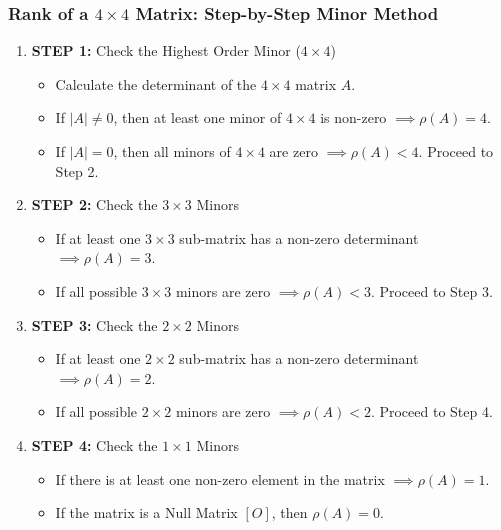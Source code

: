 \subsubsection{Rank of a $4 \times 4$ Matrix: Step-by-Step Minor Method}

\begin{enumerate}
    \item[] \textbf{STEP 1:} {Check the Highest Order Minor ($4 \times 4$)}
    \begin{itemize}
        \item Calculate the determinant of the $4 \times 4$ matrix $A$.
        \item If $|A| \neq 0$, then at least one minor of $4 \times 4$ is non-zero $\implies \rho(A) = 4$.
        \item If $|A| = 0$, then all minors of $4 \times 4$ are zero $\implies \rho(A) < 4$. Proceed to Step 2.
    \end{itemize}

    \item[] \textbf{STEP 2:} {Check the $3 \times 3$ Minors}
    \begin{itemize}
        \item If at least one $3 \times 3$ sub-matrix has a non-zero determinant $\implies \rho(A) = 3$.
        \item If all possible $3 \times 3$ minors are zero $\implies \rho(A) < 3$. Proceed to Step 3.
    \end{itemize}

    \item[] \textbf{STEP 3:} {Check the $2 \times 2$ Minors}
    \begin{itemize}
        \item If at least one $2 \times 2$ sub-matrix has a non-zero determinant $\implies \rho(A) = 2$.
        \item If all possible $2 \times 2$ minors are zero $\implies \rho(A) < 2$. Proceed to Step 4.
    \end{itemize}

    \item[] \textbf{STEP 4:} {Check the $1 \times 1$ Minors}
    \begin{itemize}
        \item If there is at least one non-zero element in the matrix $\implies \rho(A) = 1$.
        \item If the matrix is a Null Matrix $[O]$, then $\rho(A) = 0$.
    \end{itemize}
\end{enumerate}

